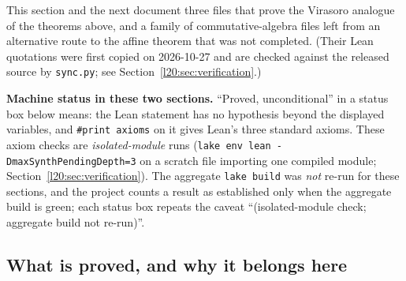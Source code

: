 This section and the next document three files that prove the Virasoro analogue of the theorems above, and a family of
commutative-algebra files left from an alternative route to the affine theorem that was not completed. (Their Lean
quotations were first copied on 2026-10-27 and are checked against the released source by \texttt{sync.py}; see
Section~\ref{l20:sec:verification}.)

\textbf{Machine status in these two sections.} ``Proved, unconditional'' in a status box below means: the Lean statement has
no hypothesis beyond the displayed variables, and \texttt{\#print axioms} on it gives Lean's three standard axioms. These
axiom checks are \emph{isolated-module} runs (\texttt{lake env lean -DmaxSynthPendingDepth=3} on a scratch file importing one
compiled module; Section~\ref{l20:sec:verification}). The aggregate \texttt{lake build} was \emph{not} re-run for these
sections, and the project counts a result as established only when the aggregate build is green; each status box repeats the
caveat ``(isolated-module check; aggregate build not re-run)''.

\subsection{What is proved, and why it belongs here}

